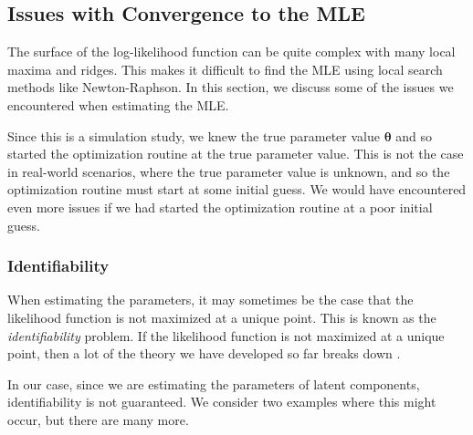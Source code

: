 \documentclass[
]{article}
\begin{document}
\hypertarget{sec:opt_rescale}{%
\subsection{Issues with Convergence to the MLE}\label{sec:opt_rescale}}

The surface of the log-likelihood function can be quite complex with
many local maxima and ridges. This makes it difficult to find the MLE
using local search methods like Newton-Raphson. In this section, we
discuss some of the issues we encountered when estimating the MLE.

Since this is a simulation study, we knew the true parameter value
\(\boldsymbol{\theta}\) and so started the optimization routine at the
true parameter value. This is not the case in real-world scenarios,
where the true parameter value is unknown, and so the optimization
routine must start at some initial guess. We would have encountered even
more issues if we had started the optimization routine at a poor initial
guess.

\hypertarget{identifiability}{%
\subsubsection*{Identifiability}\label{identifiability}}

When estimating the parameters, it may sometimes be the case that the
likelihood function is not maximized at a unique point. This is known as
the \emph{identifiability} problem. If the likelihood function is not
maximized at a unique point, then a lot of the theory we have developed
so far breaks down \citep{mclachlan2007algorithm}.

In our case, since we are estimating the parameters of latent
components, identifiability is not guaranteed. We consider two examples
where this might occur, but there are many more.
\end{document}
